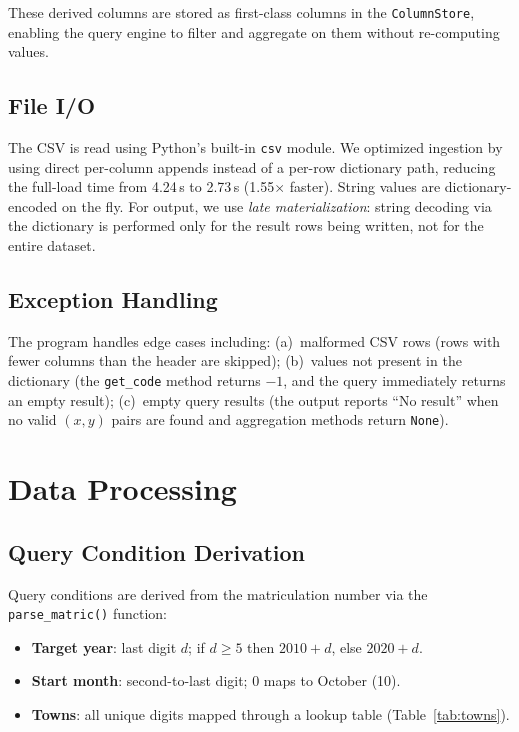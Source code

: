 \documentclass[11pt,a4paper]{article}
\begin{document}
These derived columns are stored as first-class columns in the \texttt{ColumnStore}, enabling the query engine to filter and aggregate on them without re-computing values.

\subsection{File I/O}

The CSV is read using Python's built-in \texttt{csv} module. We optimized ingestion by using direct per-column appends instead of a per-row dictionary path, reducing the full-load time from 4.24\,s to 2.73\,s (1.55$\times$ faster). String values are dictionary-encoded on the fly. For output, we use \emph{late materialization}: string decoding via the dictionary is performed only for the result rows being written, not for the entire dataset.

\subsection{Exception Handling}

The program handles edge cases including: (a)~malformed CSV rows (rows with fewer columns than the header are skipped); (b)~values not present in the dictionary (the \texttt{get\_code} method returns $-1$, and the query immediately returns an empty result); (c)~empty query results (the output reports ``No result'' when no valid $(x, y)$ pairs are found and aggregation methods return \texttt{None}).


\section{Data Processing}

\subsection{Query Condition Derivation}

Query conditions are derived from the matriculation number via the \texttt{parse\_matric()} function:

\begin{itemize}[nosep]
    \item \textbf{Target year}: last digit $d$; if $d \geq 5$ then $2010 + d$, else $2020 + d$.
    \item \textbf{Start month}: second-to-last digit; 0 maps to October (10).
    \item \textbf{Towns}: all unique digits mapped through a lookup table (Table~\ref{tab:towns}).
\end{itemize}
\end{document}
